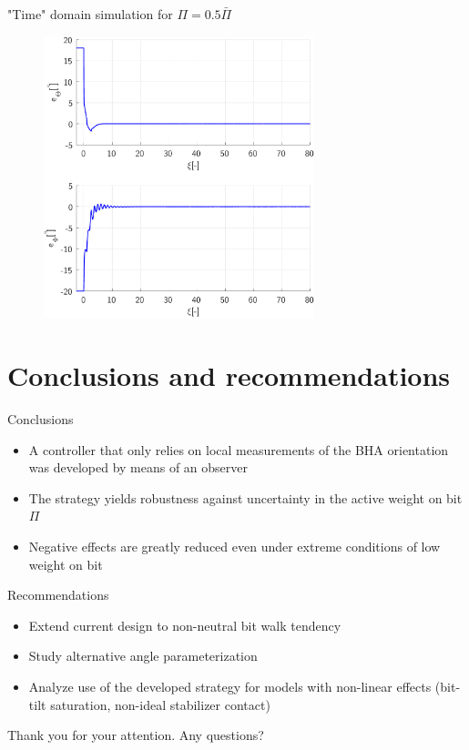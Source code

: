\documentclass{beamer}
\begin{document}
\begin{frame}{"Time" domain simulation for $\Pi = 0.5\bar{\Pi}$}
		\begin{figure}[ht]\centering
			\includegraphics[width=0.7\textwidth]{images/ErrorsNeutralRobust.pdf}
		\end{figure}
\end{frame}

\section{Conclusions and recommendations}


\begin{frame}{Conclusions}
	\begin{itemize}\setlength\itemsep{3em}
		\item A controller that only relies on local measurements of the BHA orientation was developed by means of an observer
		\item The strategy yields robustness against uncertainty in the active weight on bit $\Pi$
		\item Negative effects are greatly reduced even under extreme conditions of low weight on bit
	\end{itemize}
\end{frame}

\begin{frame}{Recommendations}
	\begin{itemize}\setlength\itemsep{3em}
		\item Extend current design to non-neutral bit walk tendency
		\item Study alternative angle parameterization
		\item Analyze use of the developed strategy for models with non-linear effects (bit-tilt saturation, non-ideal stabilizer contact)
	\end{itemize}
\end{frame}

\begin{frame}
Thank you for your attention. Any questions?
\end{frame}
\end{document}
